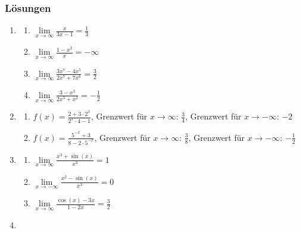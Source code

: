 \subsubsection*{Lösungen}
\begin{enumerate}
    \item

          \begin{enumerate}
              \item $\lim\limits_{x \to \infty} \frac{x}{3x - 1} = \frac{1}{3}$
              \item $\lim\limits_{x \to \infty} \frac{1 - x^2}{x} = -\infty$
              \item $\lim\limits_{x \to \infty} \frac{3x^7 - 4x^5}{2x^7 + 7x^6} = \frac{3}{2}$
              \item $\lim\limits_{x \to \infty} \frac{3 - x^3}{2x^3 + x^2} = -\frac{1}{2}$
          \end{enumerate}

    \item

          \begin{enumerate}
              \item $f(x) = \frac{2 + 3 \cdot 2^x}{2^x \cdot 4 - 1}$, Grenzwert für $x\to \infty$: $\frac{3}{4}$, Grenzwert für $x\to-\infty$: $-2$
              \item $f(x) = \frac{5^{-x} + 3}{8 - 2 \cdot 5^{-x}}$, Grenzwert für $x\to \infty$: $\frac{3}{8}$, Grenzwert für $x\to-\infty$: $-\frac{1}{2}$
          \end{enumerate}

    \item

          \begin{enumerate}
              \item $\lim\limits_{x \to \infty} \frac{x^3 + \sin(x)}{x^3} = 1$
              \item $\lim\limits_{x \to -\infty} \frac{x^2 - \sin(x)}{x^3} = 0$
              \item $\lim\limits_{x \to \infty} \frac{\cos(x) - 3x}{1 - 2x} = \frac{3}{2}$
          \end{enumerate}

    \item


\end{enumerate}
